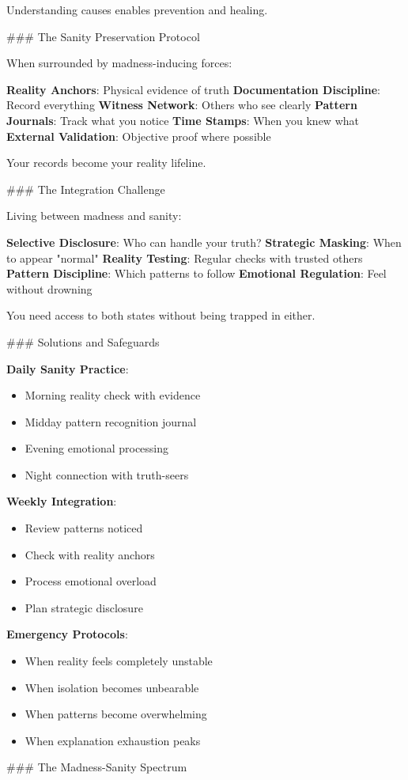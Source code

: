 \documentclass[12pt]{book}
\begin{document}
Understanding causes enables prevention and healing.

\#\#\# The Sanity Preservation Protocol

When surrounded by madness-inducing forces:

\textbf{Reality Anchors}: Physical evidence of truth
\textbf{Documentation Discipline}: Record everything
\textbf{Witness Network}: Others who see clearly
\textbf{Pattern Journals}: Track what you notice
\textbf{Time Stamps}: When you knew what
\textbf{External Validation}: Objective proof where possible

Your records become your reality lifeline.

\#\#\# The Integration Challenge

Living between madness and sanity:

\textbf{Selective Disclosure}: Who can handle your truth?
\textbf{Strategic Masking}: When to appear "normal"
\textbf{Reality Testing}: Regular checks with trusted others
\textbf{Pattern Discipline}: Which patterns to follow
\textbf{Emotional Regulation}: Feel without drowning

You need access to both states without being trapped in either.

\#\#\# Solutions and Safeguards

\textbf{Daily Sanity Practice}:
\begin{itemize}
\item Morning reality check with evidence
\item Midday pattern recognition journal
\item Evening emotional processing
\item Night connection with truth-seers

\end{itemize}
\textbf{Weekly Integration}:
\begin{itemize}
\item Review patterns noticed
\item Check with reality anchors
\item Process emotional overload
\item Plan strategic disclosure

\end{itemize}
\textbf{Emergency Protocols}:
\begin{itemize}
\item When reality feels completely unstable
\item When isolation becomes unbearable
\item When patterns become overwhelming
\item When explanation exhaustion peaks

\end{itemize}
\#\#\# The Madness-Sanity Spectrum
\end{document}
